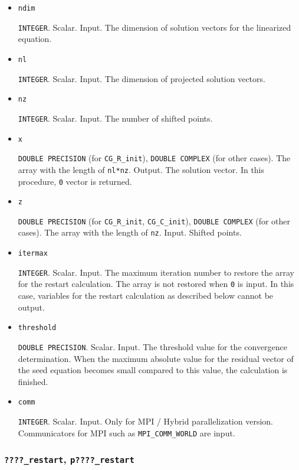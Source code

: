 \documentclass[12pt,titlepage]{article}
\begin{document}
\begin{itemize}

\item \verb|ndim|

  \verb|INTEGER|. Scalar. Input. The dimension of solution vectors for the linearized equation.

\item \verb|nl|

  \verb|INTEGER|. Scalar. Input.  The dimension of projected solution vectors.

\item \verb|nz|

  \verb|INTEGER|. Scalar. Input. The number of shifted points.

\item \verb|x|

  \verb|DOUBLE PRECISION| (for \verb|CG_R_init|),
  \verb|DOUBLE COMPLEX| (for other cases).
  The array with the length of \verb|nl*nz|. Output.
  The solution vector. In this procedure,  \verb|0| vector is returned.
  
\item \verb|z|

  \verb|DOUBLE PRECISION| (for \verb|CG_R_init|, \verb|CG_C_init|),
  \verb|DOUBLE COMPLEX| (for other cases).
The array with the length of \verb|nz|. Input. Shifted points.

\item \verb|itermax|

  \verb|INTEGER|. Scalar. Input. The maximum iteration number to restore the array for the restart calculation.
  The array is not restored when \verb|0| is input. In this case, variables for the restart calculation as described below cannot be output.

\item \verb|threshold|

  \verb|DOUBLE PRECISION|. Scalar. Input. The threshold value for the convergence determination.
  When the maximum absolute value for the residual vector of the seed equation becomes small compared to this value,
  the calculation is finished.

\item \verb|comm|

  \verb|INTEGER|. Scalar. Input. Only for MPI / Hybrid parallelization version.
  Communicators for MPI such as \verb|MPI_COMM_WORLD| are input.

\end{itemize}

\subsubsection{\texttt{????\_restart}, \texttt{p????\_restart}}
\end{document}
